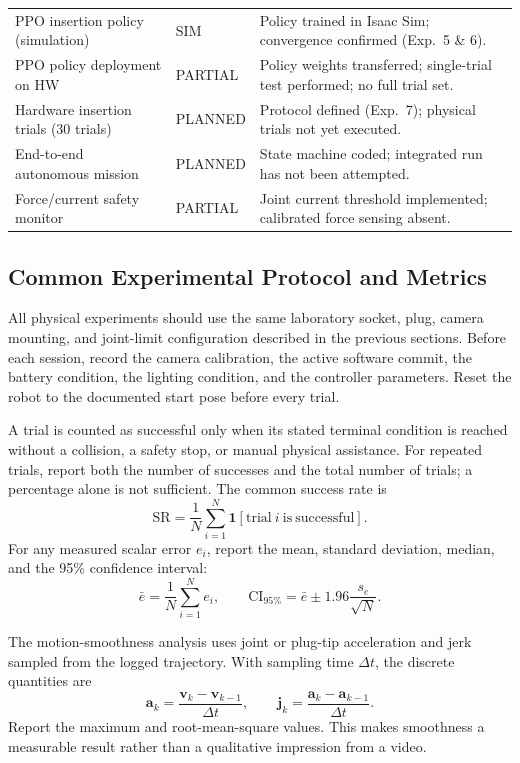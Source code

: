 \begin{table}[!htbp]
\begin{tabular}{@{}>{\raggedright\arraybackslash}p{}
                    >{\centering\arraybackslash}p{}
                    >{\raggedright\arraybackslash}p{}@{}}
PPO insertion policy (simulation) & SIM & Policy trained in Isaac Sim; convergence confirmed (Exp.~5 \& 6). \\
PPO policy deployment on HW & PARTIAL & Policy weights transferred; single-trial test performed; no full trial set. \\
Hardware insertion trials (30 trials) & PLANNED & Protocol defined (Exp.~7); physical trials not yet executed. \\
End-to-end autonomous mission & PLANNED & State machine coded; integrated run has not been attempted. \\
Force/current safety monitor & PARTIAL & Joint current threshold implemented; calibrated force sensing absent. \\
\bottomrule
\end{tabular}
\end{table}

\subsection{Common Experimental Protocol and Metrics}\label{exp:sec:protocol}

All physical experiments should use the same laboratory socket, plug, camera mounting, and joint-limit configuration described in the previous sections. Before each session, record the camera calibration, the active software commit, the battery condition, the lighting condition, and the controller parameters. Reset the robot to the documented start pose before every trial.

A trial is counted as successful only when its stated terminal condition is reached without a collision, a safety stop, or manual physical assistance. For repeated trials, report both the number of successes and the total number of trials; a percentage alone is not sufficient. The common success rate is
\begin{equation}
\mathrm{SR}=\frac{1}{N}\sum_{i=1}^{N}\mathbf{1}[\mathrm{trial}\ i\ \mathrm{is\ successful}].
\label{exp:eq:success-rate}
\end{equation}
For any measured scalar error $e_i$, report the mean, standard deviation, median, and the 95\% confidence interval:
\begin{equation}
\bar e=\frac{1}{N}\sum_{i=1}^{N}e_i,\qquad
\mathrm{CI}_{95\%}=\bar e\pm1.96\frac{s_e}{\sqrt{N}}.
\label{exp:eq:common-statistics}
\end{equation}

The motion-smoothness analysis uses joint or plug-tip acceleration and jerk sampled from the logged trajectory. With sampling time $\Delta t$, the discrete quantities are
\begin{equation}
\mathbf{a}_k=\frac{\mathbf{v}_k-\mathbf{v}_{k-1}}{\Delta t},\qquad
\mathbf{j}_k=\frac{\mathbf{a}_k-\mathbf{a}_{k-1}}{\Delta t}.
\label{exp:eq:jerk}
\end{equation}
Report the maximum and root-mean-square values. This makes smoothness a measurable result rather than a qualitative impression from a video.

